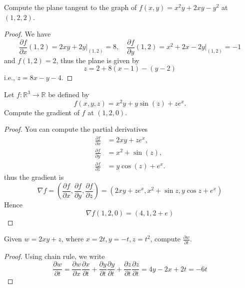 \documentclass[openany]{book}
\begin{document}
\newpage 
\begin{prob}
    Compute the plane tangent to the graph of $f(x,y)=x^2y+2xy-y^2$ at $(1,2,2)$.
\end{prob}
\begin{proof}
    We have 
    \begin{equation*}
        \frac{\partial f}{\partial x}(1,2)=2xy+2y\vert_{(1,2)}=8, \quad \frac{\partial f}{\partial y}(1,2)=x^2+2x-2y\vert_{(1,2)}=-1
    \end{equation*}
    and $f(1,2)=2$, thus the plane is given by
    \begin{equation*}
        z=2+8(x-1)-(y-2)
    \end{equation*}
    i.e., $z=8x-y-4$.
\end{proof}





\begin{prob}
    Let \( f : \mathbb{R}^3 \to \mathbb{R} \) be defined by  
\[
f(x, y, z) = x^2 y + y \sin(z) + z e^x.
\]  
Compute the gradient of $f$ at $(1,2,0)$.
\end{prob}
\begin{proof}
    You can compute the partial derivatives 
    \begin{align*}
        \frac{\partial f}{\partial x} &= 2xy + ze^x, \\
        \frac{\partial f}{\partial y} &= x^2 + \sin(z), \\
        \frac{\partial f}{\partial z} &= y \cos(z) + e^x.
        \end{align*}
    thus the gradient is 
    \[
\nabla f = \left( \frac{\partial f}{\partial x}, \frac{\partial f}{\partial y}, \frac{\partial f}{\partial z} \right)=(2xy+ze^x, x^2+\sin z, y\cos z+e^x)
\]
Hence 
\begin{equation*}
    \nabla f(1,2,0)=(4, 1, 2+e)
\end{equation*}
\end{proof}


\begin{prob}
    Given $w=2xy+z$, where $x=2t, y=-t, z=t^2$, compute $\frac{\partial w}{\partial t}$.
\end{prob}
\begin{proof}
    Using chain rule, we write 
    \begin{equation*}
        \frac{\partial w}{\partial t}=\frac{\partial w}{\partial x}\frac{\partial x}{\partial t}+\frac{\partial y}{\partial t}\frac{\partial y}{\partial t}+\frac{\partial z}{\partial t}\frac{\partial z}{\partial t}=4y-2x+2t=-6t
    \end{equation*}

\end{proof}
\end{document}

